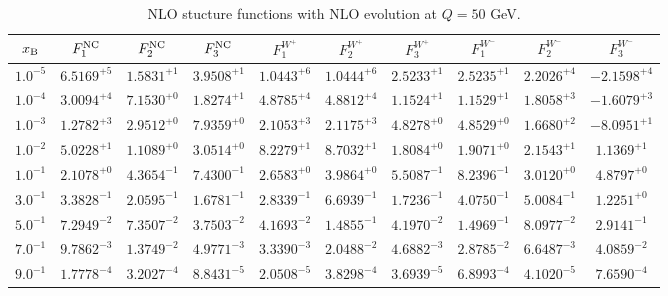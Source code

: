 \begin{table}[h]
\begin{adjustbox}{width=\textwidth}
\begin{tabular}{|c||c|c|c|c|c|c|c|c|c|}
\hline
$x_{\rm B}$ & $F_1^{\rm NC}$ & $F_2^{\rm NC}$ & $F_3^{\rm NC}$ & $F_1^{W^+}$ & $F_2^{W^+}$ & $F_3^{W^+}$ & $F_1^{W^-}$ & $F_2^{W^-}$ & $F_3^{W^-}$ \\
\hline
$ 1.0^{-5}$ & $ 6.5169^{+5}$ & $ 1.5831^{+1}$ & $ 3.9508^{+1}$ & $ 1.0443^{+6}$ & $ 1.0444^{+6}$ & $ 2.5233^{+1}$ & $ 2.5235^{+1}$ & $ 2.2026^{+4}$ & $-2.1598^{+4}$ \\
$ 1.0^{-4}$ & $ 3.0094^{+4}$ & $ 7.1530^{+0}$ & $ 1.8274^{+1}$ & $ 4.8785^{+4}$ & $ 4.8812^{+4}$ & $ 1.1524^{+1}$ & $ 1.1529^{+1}$ & $ 1.8058^{+3}$ & $-1.6079^{+3}$ \\
$ 1.0^{-3}$ & $ 1.2782^{+3}$ & $ 2.9512^{+0}$ & $ 7.9359^{+0}$ & $ 2.1053^{+3}$ & $ 2.1175^{+3}$ & $ 4.8278^{+0}$ & $ 4.8529^{+0}$ & $ 1.6680^{+2}$ & $-8.0951^{+1}$ \\
$ 1.0^{-2}$ & $ 5.0228^{+1}$ & $ 1.1089^{+0}$ & $ 3.0514^{+0}$ & $ 8.2279^{+1}$ & $ 8.7032^{+1}$ & $ 1.8084^{+0}$ & $ 1.9071^{+0}$ & $ 2.1543^{+1}$ & $ 1.1369^{+1}$ \\
$ 1.0^{-1}$ & $ 2.1078^{+0}$ & $ 4.3654^{-1}$ & $ 7.4300^{-1}$ & $ 2.6583^{+0}$ & $ 3.9864^{+0}$ & $ 5.5087^{-1}$ & $ 8.2396^{-1}$ & $ 3.0120^{+0}$ & $ 4.8797^{+0}$ \\
$ 3.0^{-1}$ & $ 3.3828^{-1}$ & $ 2.0595^{-1}$ & $ 1.6781^{-1}$ & $ 2.8339^{-1}$ & $ 6.6939^{-1}$ & $ 1.7236^{-1}$ & $ 4.0750^{-1}$ & $ 5.0084^{-1}$ & $ 1.2251^{+0}$ \\
$ 5.0^{-1}$ & $ 7.2949^{-2}$ & $ 7.3507^{-2}$ & $ 3.7503^{-2}$ & $ 4.1693^{-2}$ & $ 1.4855^{-1}$ & $ 4.1970^{-2}$ & $ 1.4969^{-1}$ & $ 8.0977^{-2}$ & $ 2.9141^{-1}$ \\
$ 7.0^{-1}$ & $ 9.7862^{-3}$ & $ 1.3749^{-2}$ & $ 4.9771^{-3}$ & $ 3.3390^{-3}$ & $ 2.0488^{-2}$ & $ 4.6882^{-3}$ & $ 2.8785^{-2}$ & $ 6.6487^{-3}$ & $ 4.0859^{-2}$ \\
$ 9.0^{-1}$ & $ 1.7778^{-4}$ & $ 3.2027^{-4}$ & $ 8.8431^{-5}$ & $ 2.0508^{-5}$ & $ 3.8298^{-4}$ & $ 3.6939^{-5}$ & $ 6.8993^{-4}$ & $ 4.1020^{-5}$ & $ 7.6590^{-4}$ \\
\hline
\end{tabular}
\end{adjustbox}\caption{NLO stucture functions with NLO evolution at $Q = 50$ GeV.}
\label{tab:N1LO-Q50}
\end{table}


